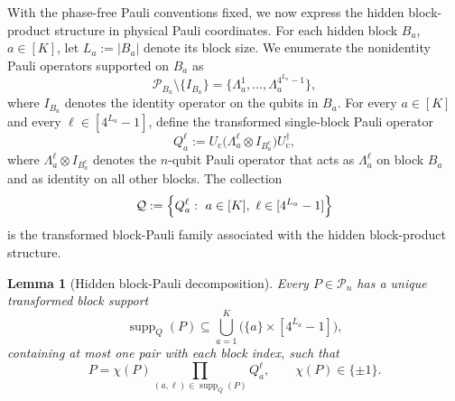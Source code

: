 \documentclass[
  aps,
  prx,
  reprint,
  superscriptaddress,
  amsmath,
  amssymb,
  nofootinbib,
  longbibliography
]{revtex4-2}
\newtheorem{lemma}[theorem]{Lemma}
\newcommand{\supp}{\operatorname{supp}}
\newcommand{\Pc}{\mathcal{P}}
\begin{document}
With the phase-free Pauli conventions fixed, we now express the hidden
block-product structure in physical Pauli coordinates.  For each hidden
block $B_a$, $a\in[K]$, let $L_a:=|B_a|$ denote its block size.  We enumerate
the nonidentity Pauli operators supported on $B_a$ as
\begin{equation}
\Pc_{B_a}\setminus\{I_{B_a}\}
=
\{\Lambda_a^1,\dots,\Lambda_a^{4^{L_a}-1}\},
\end{equation}
where $I_{B_a}$ denotes the identity operator on the qubits in $B_a$.
For every $a\in[K]$ and every
$\ell\in[4^{L_a}-1]$, define the transformed single-block Pauli
operator
\begin{equation}
Q_a^\ell
:=
U_{\mathrm c}
\bigl(
\Lambda_a^\ell \otimes I_{B_a^c}
\bigr)
U_{\mathrm c}^\dagger ,
\label{eq:supp-transformed-block-pauli-indexed}
\end{equation}
where $\Lambda_a^\ell\otimes I_{B_a^c}$ denotes the
$n$-qubit Pauli operator that acts as $\Lambda_a^\ell$ on block
$B_a$ and as identity on all other blocks.  The collection
\begin{equation}
\mathcal Q
:=
\Bigl\{
Q_a^\ell:\ a\in[K],\ \ell\in[4^{L_a}-1]
\Bigr\}
\end{equation}
is the transformed block-Pauli family associated with the hidden
block-product structure.

\begin{lemma}[Hidden block-Pauli decomposition]
\label{lem:supp-hidden-block-pauli-decomposition}
Every $P\in\Pc_n$ has a unique transformed block support
\begin{equation}
\supp_Q(P)
\subseteq
\bigcup_{a=1}^K\bigl(\{a\}\times[4^{L_a}-1]\bigr),
\end{equation}
containing at most one pair with each block index, such that
\begin{equation}
P
=
\chi(P)\prod_{(a,\ell)\in\supp_Q(P)}Q_a^\ell,
\qquad
\chi(P)\in\{\pm1\}.
\label{eq:supp-block-support-decomp}
\end{equation}
\end{lemma}
\end{document}
